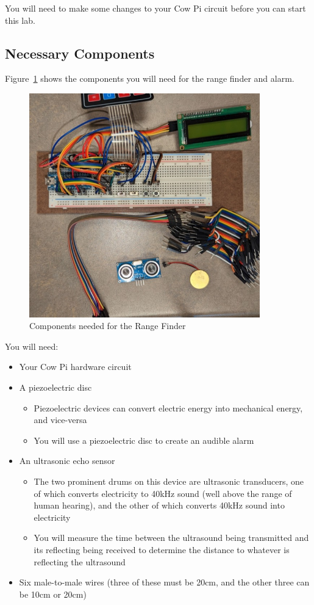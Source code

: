 You will need to make some changes to your Cow Pi circuit before you can start this lab.

\subsection{Necessary Components}

Figure~\ref{fig:components} shows the components you will need for the range finder and alarm.

\begin{figure}
    \centering
    \includegraphics[width=10cm]{reconfiguration_images/components}
    \caption{Components needed for the Range Finder \label{fig:components}}
\end{figure}

You will need:
\begin{itemize}
    \item Your Cow Pi hardware circuit
    \item A piezoelectric disc
        \begin{itemize}
            \item Piezoelectric devices can convert electric energy into mechanical energy, and vice-versa
            \item You will use a piezoelectric disc to create an audible alarm
        \end{itemize}
    \item An ultrasonic echo sensor
        \begin{itemize}
            \item The two prominent drums on this device are ultrasonic transducers, one of which converts electricity to 40kHz sound (well above the range of human hearing), and the other of which converts 40kHz sound into electricity
            \item You will measure the time between the ultrasound being transmitted and its reflecting being received to determine the distance to whatever is reflecting the ultrasound
        \end{itemize}
    \item Six male-to-male wires (three of these must be 20cm, and the other three can be 10cm or 20cm)
\end{itemize}

